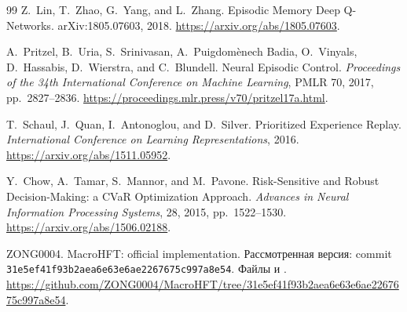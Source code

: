 \documentclass[9pt,a4paper,twocolumn]{extarticle}
\begin{document}
\begin{thebibliography}{99}
  Z.~Lin, T.~Zhao, G.~Yang, and L.~Zhang.
  \newblock
  Episodic Memory Deep Q-Networks.
  \newblock
  arXiv:1805.07603, 2018.
  \newblock
  \url{https://arxiv.org/abs/1805.07603}.

  A.~Pritzel, B.~Uria, S.~Srinivasan,
  A.~Puigdom\`enech Badia, O.~Vinyals,
  D.~Hassabis, D.~Wierstra, and C.~Blundell.
  \newblock
  Neural Episodic Control.
  \newblock
  \emph{Proceedings of the 34th International
  Conference on Machine Learning},
  PMLR 70, 2017, pp.~2827--2836.
  \newblock
  \url{https://proceedings.mlr.press/v70/pritzel17a.html}.

  T.~Schaul, J.~Quan, I.~Antonoglou,
  and D.~Silver.
  \newblock
  Prioritized Experience Replay.
  \newblock
  \emph{International Conference
  on Learning Representations}, 2016.
  \newblock
  \url{https://arxiv.org/abs/1511.05952}.

  Y.~Chow, A.~Tamar, S.~Mannor,
  and M.~Pavone.
  \newblock
  Risk-Sensitive and Robust Decision-Making:
  a CVaR Optimization Approach.
  \newblock
  \emph{Advances in Neural Information
  Processing Systems}, 28, 2015,
  pp.~1522--1530.
  \newblock
  \url{https://arxiv.org/abs/1506.02188}.

  ZONG0004.
  \newblock
  MacroHFT: official implementation.
  \newblock
  Рассмотренная версия:
  commit
  \texttt{31e5ef41f93b2aea6e63e6ae2267675c997a8e54}.
  Файлы
  и .
  \newblock
  \url{https://github.com/ZONG0004/MacroHFT/tree/31e5ef41f93b2aea6e63e6ae2267675c997a8e54}.


\end{thebibliography}
\end{document}
